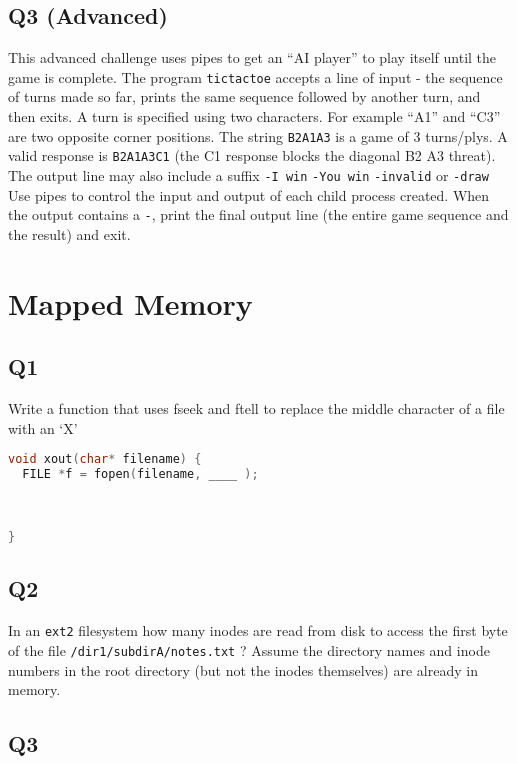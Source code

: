 \subsection{Q3 (Advanced)}\label{q3-advanced}

This advanced challenge uses pipes to get an ``AI player'' to play itself until the game is complete. The program \texttt{tictactoe} accepts a line of input - the sequence of turns made so far, prints the same sequence followed by another turn, and then exits. A turn is specified using two characters. For example ``A1'' and ``C3'' are two opposite corner positions. The string \texttt{B2A1A3} is a game of 3 turns/plys. A valid response is \texttt{B2A1A3C1} (the C1 response blocks the diagonal B2 A3 threat). The output line may also include a suffix \texttt{-I\ win} \texttt{-You\ win} \texttt{-invalid} or \texttt{-draw} Use pipes to control the input and output of each child process created. When the output contains a \texttt{-}, print the final output line (the entire game sequence and the result) and exit.

\section{Mapped Memory}

\subsection{Q1}\label{q1-4}

Write a function that uses fseek and ftell to replace the middle character of a file with an `X'

\begin{lstlisting}[language=C]
void xout(char* filename) {
  FILE *f = fopen(filename, ____ );
  


}
\end{lstlisting}

\subsection{Q2}\label{q2-4}

In an \texttt{ext2} filesystem how many inodes are read from disk to access the first byte of the file \texttt{/dir1/subdirA/notes.txt} ? Assume the directory names and inode numbers in the root directory (but not the inodes themselves) are already in memory.

\subsection{Q3}\label{q3-3}

